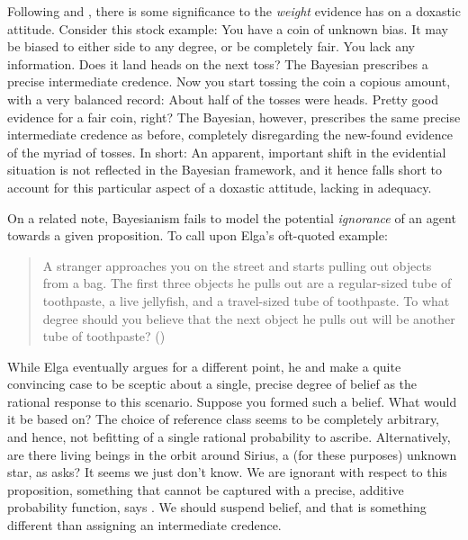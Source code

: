 \documentclass[11pt, a4paper]{scrartcl}
\begin{document}
Following \citet{Joyce2005-JOYHPR} and \citet{sep-imprecise-probabilities}, there is some significance to the \emph{weight} evidence has on a doxastic attitude. Consider this stock example: You have a coin of unknown bias. It may be biased to either side to any degree, or be completely fair. You lack any information. Does it land heads on the next toss? The Bayesian prescribes a precise intermediate credence. Now you start tossing the coin a copious amount, with a very balanced record: About half of the tosses were heads. Pretty good evidence for a fair coin, right? The Bayesian, however, prescribes the same precise intermediate credence as before, completely disregarding the new-found evidence of the myriad of tosses. In short: An apparent, important shift in the evidential situation is not reflected in the Bayesian framework, and it hence falls short to account for this particular aspect of a doxastic attitude, lacking in adequacy. 

On a related note, Bayesianism fails to model the potential \emph{ignorance} of an agent towards a given proposition. To call upon Elga's oft-quoted example:
\begin{quote}
A stranger approaches you on the street and starts pulling out objects from a bag. The first three objects he pulls out are a regular-sized tube of toothpaste, a live jellyfish, and a travel-sized tube of toothpaste. To what degree should you believe that the next object he pulls out will be another tube of toothpaste?
(\citet{Elga2010-ELGSPS})
\end{quote}
While Elga eventually argues for a different point, he and \citet{sep-imprecise-probabilities} make a quite convincing case to be sceptic about a single, precise degree of belief as the rational response to this scenario. Suppose you formed such a belief. What would it be based on? The choice of reference class seems to be completely arbitrary, and hence, not befitting of a single rational probability to ascribe. Alternatively, are there living beings in the orbit around Sirius, a (for these purposes) unknown star, as \citet{Shafer1976-SHAAMT} asks? It seems we just don't know. We are ignorant with respect to this proposition, something that cannot be captured with a precise, additive probability function, says \citet{Norton2011-NORCTB}. We should suspend belief, and that is something different than assigning an intermediate credence.
\end{document}
